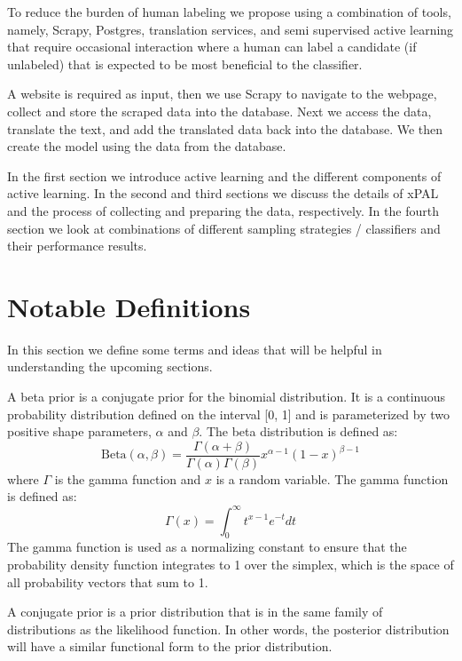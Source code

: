 To reduce the burden of human labeling we propose using a combination of tools, namely, Scrapy, Postgres, translation services, and semi supervised active learning that require occasional interaction where a human can label a candidate (if unlabeled) that is expected to be most beneficial to the classifier. 

A website is required as input, then we use Scrapy to navigate to the webpage, collect and store the scraped data into the database. Next we access the data, translate the text, and add the translated data back into the database. We then create the model using the data from the database. 

In the first section we introduce active learning and the different components of active learning. In the second and third sections we discuss the details of xPAL and the process of collecting and preparing the data, respectively. In the fourth section we look at combinations of different sampling strategies / classifiers and their performance results.

\section*{Notable Definitions}

In this section we define some terms and ideas that will be helpful in understanding the upcoming sections.

\begin{defn}
\label{def:beta_prior}
A beta prior is a conjugate prior for the binomial distribution. It is a continuous probability distribution defined on the interval [0, 1] and is parameterized by two positive shape parameters, \(\alpha\) and \(\beta\). The beta distribution is defined as: 
\[\text{Beta}(\alpha, \beta) = \frac{\Gamma(\alpha + \beta)}{\Gamma(\alpha)\Gamma(\beta)}x^{\alpha - 1}(1 - x)^{\beta - 1}\]
where \(\Gamma\) is the gamma function and \(x\) is a random variable. The gamma function is defined as:
\[\Gamma(x) = \int_0^\infty t^{x - 1}e^{-t}dt\]
The gamma function is used as a normalizing constant to ensure that the probability density function integrates to 1 over the simplex, which is the space of all probability vectors that sum to 1.
\end{defn}

\begin{defn}
\label{def:conjugate_prior}
A conjugate prior is a prior distribution that is in the same family of distributions as the likelihood function. In other words, the posterior distribution will have a similar functional form to the prior distribution.
\end{defn}


